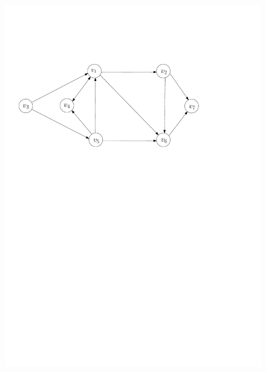 \documentclass[12pt,a4paper,twoside]{scrartcl}
\numberwithin{equation}{section}
\begin{document}
\begin{figure}[h!]
  \centering
  \begin{minipage}[b]{0.49\textwidth}
\includegraphics[scale = 0.5]{1/directedGraph.pdf}


\end{minipage}
\end{figure}
\end{document}
